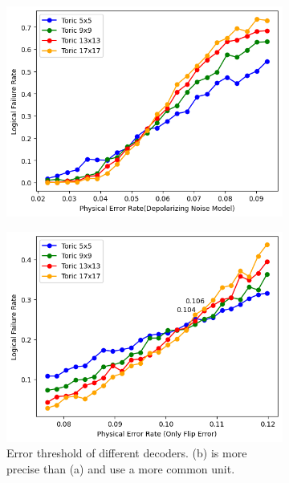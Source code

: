 \documentclass[
    a4paper, %
    10pt, %
    unnumberedsections, %
    twoside, %
]{LTJournalArticle}
\begin{document}
\begin{figure}[htbp] %
    \centering %
    \vspace{0cm} %
    \setlength{\abovecaptionskip}{0.cm} %
    \setlength{\belowcaptionskip}{0.cm} %
    \setlength{\belowdisplayskip}{3pt} %
    \begin{subfigure}[b]{0.9\linewidth}
        \includegraphics[width=\linewidth]{img/errorThres.png}
        \caption{}
        \label{fig:errorrate1}
    \end{subfigure}
    \hfill
    \begin{subfigure}[b]{0.9\linewidth}
        \includegraphics[width=\linewidth]{img/errorThres2.png}
        \caption{Error threshold of different decoders. (b) is more precise than (a) and use a more common unit.}
        \label{fig:errorate2}
    \end{subfigure}
    \caption{}
    \end{figure}
\end{document}
